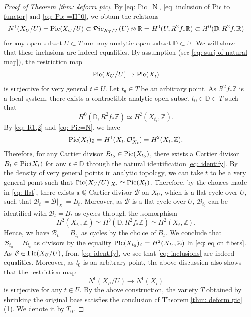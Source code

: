 \documentclass[11pt,oneside,reqno]{amsart}
\numberwithin{equation}{section}
\theoremstyle{definition}
\newcommand{\Pic}{{\rm {Pic}}}
\newcommand{\bD}{\mathbb{D}}
\newcommand{\bQ}{\mathbb{Q}}
\newcommand{\bR}{\mathbb{R}}
\newcommand{\bZ}{\mathbb{Z}}
\newcommand{\mB}{\mathcal{B}}
\newcommand{\mO}{\mathcal{O}}
\newcommand{\mP}{\mathcal{P}}
\begin{document}
\begin{proof}[Proof of Theorem \ref{thm: deform pic}]
By \eqref{eq: Pic=N}, \eqref{eq: inclusion of Pic to functor} and \eqref{eq: Pic =H^0}, we obtain the relations
\begin{equation}\label{eq: inclusions}
N^1(X_U/U)=\Pic(X_U/U) \subset  {\mP}ic_{X_T/T}(U) \otimes \bR= H^0(U, R^2f_*\bR) \subset H^0(\bD, R^2f_*\bR)
\end{equation} for any open subset $U\subset T$ and any analytic open subset $\bD \subset U$. We will show that these inclusions are indeed equalities.
By assumption (see \eqref{eq: surj of natural map}), the restriction map 
\[
\Pic(X_U/U)\to \Pic(X_t)
\] is surjective for very general $t\in U$. Let $t_0\in T$ be an arbitrary point. As $R^2f_*\bZ$ is a local system, there exists a contractible analytic open subset $t_0\in \bD\subset T$ such that
\begin{equation}\label{eq: identify}
H^0(\bD, R^2f_*\bZ) \simeq H^2(X_{t_0}, \bZ).
\end{equation} By \eqref{eq: R1,2} and \eqref{eq: Pic=N}, we have
\begin{equation}\label{eq: eq on fibers}
\Pic(X_t)_{\bZ} = H^1(X_t, \mO_{X_t}^*)=H^2(X_{t}, \bZ).
\end{equation} Therefore, for any Cartier divisor $B_{t_0}\in \Pic(X_{t_0})$, there exists a Cartier divisor $B_t \in \Pic(X_t)$ for any $t\in \bD$ through the natural identification \eqref{eq: identify}. By the density of very general points in analytic topology, we can take $t$ to be a very general point such that $\Pic(X_U/U)|_{X_t}\simeq \Pic(X_t)$. Therefore, by the choices made in \eqref{eq: flat}, there exists a $\bQ$-Cartier divisor $\mB$ on $X_U$, which is a flat cycle over $U$, such that $\mB_{t}\coloneqq \mB|_{X_t}=B_t$. Moreover, as $\mB$ is a flat cycle over $U$,  $\mB_{t_0}$ can be identified with $\mB_{t}=B_t$ as cycles through the isomorphism
\begin{equation}\label{eq: identify fibers}
H^2(X_{t_0}, \bZ)\simeq H^0(\bD, R^2f_*\bZ) \simeq H^2(X_{t}, \bZ).
\end{equation} Hence, we have $\mB_{t_0}= B_{t_0}$ as cycles by the choice of $B_t$. We conclude that $\mB_{t_0}=B_{t_0}$ as divisors by the equality $\Pic(X_{t_0})_{\mathbb Z}=H^2(X_{t_0},\mathbb Z)$ in \eqref{eq: eq on fibers}. As $\mB \in \Pic(X_U/U)$, from \eqref{eq: identify}, we see that \eqref{eq: inclusions} are indeed equalities. Moreover, as $t_0$ is an arbitrary point, the above discussion also shows that the restriction map
\[
N^1(X_U/U) \to N^1(X_t)
\] is surjective for any $t\in U$. By the above construction, the variety $T$ obtained by shrinking the original base satisfies the conclusion of Theorem \ref{thm: deform pic} (1). We denote it by $T_0$.



\end{proof}
\end{document}
